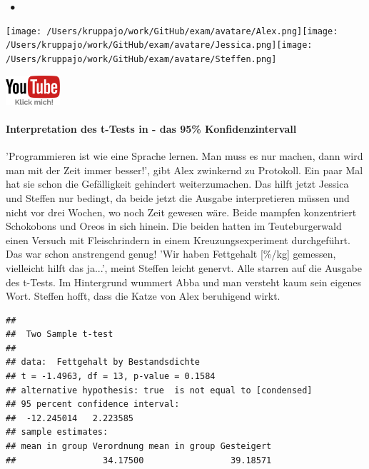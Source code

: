 \documentclass[a4paper, 9pt]{scrartcl}\usepackage[]{graphicx}\usepackage[]{xcolor}
\makeatletter
\newenvironment{kframe}{%
 \def\at@end@of@kframe{}%
 \ifinner\ifhmode%
  \def\at@end@of@kframe{\end{minipage}}%
  \begin{minipage}{\columnwidth}%
 \fi\fi%
 \def\FrameCommand##1{\hskip\@totalleftmargin \hskip-\fboxsep
 \colorbox{shadecolor}{##1}\hskip-\fboxsep
     \hskip-\linewidth \hskip-\@totalleftmargin \hskip\columnwidth}%
 \MakeFramed {\advance\hsize-\width
   \@totalleftmargin\z@ \linewidth\hsize
   \@setminipage}}%
 {\par\unskip\endMakeFramed%
 \at@end@of@kframe}
\newenvironment{knitrout}{}{} %
\makeatother
\begin{document}
 
\ifcollection
\begin{flushright}
\tiny\vspace{-3Ex}
\textbf{\examinhaltstart}
\exammodulestatversuch $\;\bullet$
\exammodulebiostat
\vspace{-4Ex}
\end{flushright}
\begin{minipage}[t]{0.5\textwidth}
\texttt{[image: /Users/kruppajo/work/GitHub/exam/avatare/Alex.png]}\hspace{-4mm}\texttt{[image: /Users/kruppajo/work/GitHub/exam/avatare/Jessica.png]}\hspace{-4mm}\texttt{[image: /Users/kruppajo/work/GitHub/exam/avatare/Steffen.png]}
\end{minipage}
\begin{minipage}[t]{0.5\textwidth}
\hfill
\href{https://youtu.be/wJqsNV1hOW8}{\includegraphics[width = 2cm]{img/youtube}}
\end{minipage}
\fi



\ifcollection
\paragraph{Interpretation des t-Tests in \Rlogo - das 95\% Konfidenzintervall}
\fi


'Programmieren ist wie eine Sprache lernen. Man muss es nur machen, dann wird man mit der Zeit immer besser!', gibt Alex zwinkernd zu Protokoll. Ein paar Mal hat sie schon die Gefälligkeit gehindert weiterzumachen. Das hilft jetzt Jessica und Steffen nur bedingt, da beide jetzt die \Rlogo Ausgabe interpretieren müssen und nicht vor drei Wochen, wo noch Zeit gewesen wäre. Beide mampfen konzentriert Schokobons und Oreos in sich hinein. Die beiden hatten im Teuteburgerwald einen Versuch mit Fleischrindern in einem Kreuzungsexperiment durchgeführt. Das war schon anstrengend genug! 'Wir haben Fettgehalt [\%/kg] gemessen, vielleicht hilft das ja...', meint Steffen leicht genervt. Alle starren auf die \Rlogo Ausgabe des t-Tests. Im Hintergrund wummert Abba und man versteht kaum sein eigenes Wort. Steffen hofft, dass die Katze von Alex beruhigend wirkt.

\begin{knitrout}
\color{fgcolor}\begin{kframe}
\begin{verbatim}
## 
## 	Two Sample t-test
## 
## data:  Fettgehalt by Bestandsdichte
## t = -1.4963, df = 13, p-value = 0.1584
## alternative hypothesis: true  is not equal to [condensed]
## 95 percent confidence interval:
##  -12.245014   2.223585
## sample estimates:
## mean in group Verordnung mean in group Gesteigert 
##                 34.17500                 39.18571
\end{verbatim}
\end{kframe}
\end{knitrout}
\end{document}

